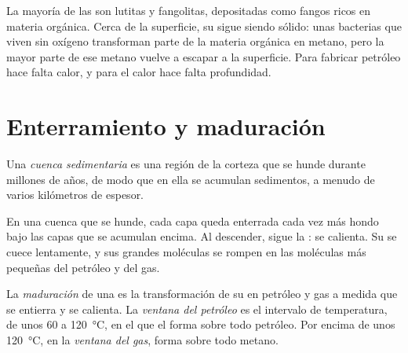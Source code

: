 La mayoría de las  son lutitas y fangolitas, depositadas como
fangos ricos en materia orgánica. Cerca de la superficie, su  sigue
siendo sólido: unas bacterias que viven sin oxígeno transforman parte de la
materia orgánica en metano, pero la mayor parte de ese metano vuelve a escapar
a la superficie. Para fabricar petróleo hace falta calor, y para el calor hace falta profundidad.

\section{Enterramiento y maduración}

\begin{definition}\label{def:g11:fossil-fuel-geology:basin}
Una \emph{cuenca sedimentaria} es una región de la
corteza que se hunde durante millones de años, de modo que en ella se
acumulan sedimentos, a menudo de varios kilómetros de espesor.
\end{definition}

En una cuenca que se hunde, cada capa queda enterrada cada vez más hondo bajo
las capas que se acumulan encima. Al descender, sigue la : se calienta.
Su  se cuece lentamente, y sus grandes moléculas se rompen en las
moléculas más pequeñas del petróleo y del gas.

\begin{definition}\label{def:g11:fossil-fuel-geology:oil-window}
La \emph{maduración} de una  es la
transformación de su  en petróleo y gas a medida que se entierra y se
calienta. La \emph{ventana del petróleo} es el
intervalo de temperatura, de unos 60 a \qty{120}{\degreeCelsius}, en el que el
 forma sobre todo petróleo. Por encima de unos \qty{120}{\degreeCelsius},
en la \emph{ventana del gas}, forma sobre todo metano.
\end{definition}

